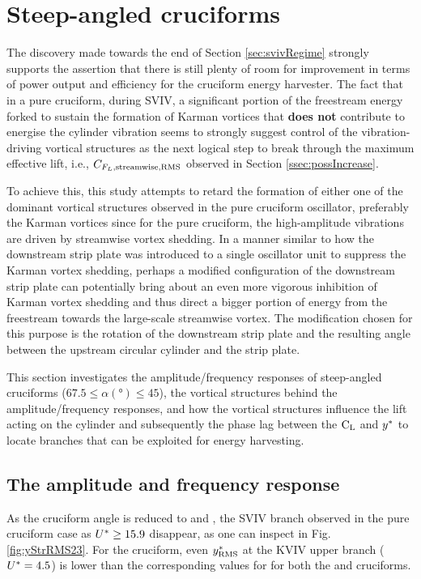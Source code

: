 \documentclass[oneside]{utmthesis}
\begin{document}
\section{Steep-angled cruciforms}\label{sec:transitionToKarman}
The discovery made towards the end of Section \ref{sec:svivRegime} strongly supports the assertion that there is still plenty of room for improvement in terms of power output and efficiency for the cruciform energy harvester. The fact that in a pure cruciform, during SVIV, a significant portion of the freestream energy forked to sustain the formation of Karman vortices that \textbf{does not} contribute to energise the cylinder vibration seems to strongly suggest control of the vibration-driving vortical structures as the next logical step to break through the maximum effective lift, i.e., $C_{F_{L},\text{streamwise},\text{RMS}}$ observed in Section \ref{ssec:possIncrease}.

To achieve this, this study attempts to retard the formation of either one of the dominant vortical structures observed in the pure cruciform oscillator, preferably the Karman vortices since for the pure cruciform, the high-amplitude vibrations are driven by streamwise vortex shedding. In a manner similar to how the downstream strip plate was introduced to a single oscillator unit to suppress the Karman vortex shedding, perhaps a modified configuration of the downstream strip plate can potentially bring about an even more vigorous inhibition of Karman vortex shedding and thus direct a bigger portion of energy from the freestream towards the large-scale streamwise vortex. The modification chosen for this purpose is the rotation of the downstream strip plate and the resulting angle between the upstream circular cylinder and the strip plate.

This section investigates the amplitude/frequency responses of steep-angled cruciforms ($67.5 \leq \alpha (\si{\degree}) \leq 45$), the vortical structures behind the amplitude/frequency responses, and how the vortical structures influence the lift acting on the cylinder and subsequently the phase lag between the $\text{C}_{\text{L}}$ and $y^{*}$ to locate branches that can be exploited for energy harvesting.

\subsection{The amplitude and frequency response}\label{ssec:transRegimeAmpFreqResp}

As the cruciform angle is reduced to \angfo{} and \angth{}, the SVIV branch observed in the pure cruciform case as $U^{*} \geq 15.9$ disappear, as one can inspect in Fig. \ref{fig:yStrRMS23}. For the \angth{} cruciform, even $y^{*}_{\text{RMS}}$ at the KVIV upper branch ($U^{*} = 4.5$) is lower than the corresponding values for for both the \angfi{} and \angfo{} cruciforms.
\end{document}
